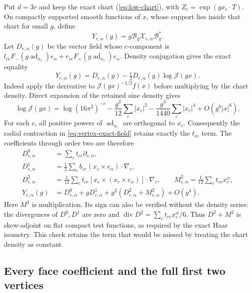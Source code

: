 Put $d=3r$ and keep the exact chart (\ref{eq:low-chart}), with
$Z_c=\exp(gx_c\cdot T)$. On compactly supported smooth functions of
$x$, whose support lies inside that chart for small $g$, define
\[
 Y_{e,\alpha}(g)=g\mathcal B_g\mathcal X_{e,\alpha}\mathcal B_g^*.
\]
Let $D_{e,\alpha}(g)$ be the vector field whose $c$-component is
$l_{ce}F_-(g\operatorname{ad}_{x_c})e_\alpha+
r_{ce}F_+(g\operatorname{ad}_{x_c})e_\alpha$.
Density conjugation gives the exact equality
\begin{equation}\label{eq:vertex-exact-field}
 Y_{e,\alpha}(g)=D_{e,\alpha}(g)
                 -\tfrac12D_{e,\alpha}(g)\log\mathcal J(gx).
\end{equation}
Indeed apply the derivative to $\mathcal J(gx)^{-1/2}f(x)$
before multiplying by the chart density. Direct expansion of the
retained sine density gives
\[
 \log\mathcal J(gx)=\log(16\pi^2)^{-r}
       -\frac{g^2}{12}\sum_c|x_c|^2
       -\frac{g^4}{1440}\sum_c|x_c|^4+O(g^6|x|^6).
\]
For each $c$, all positive powers of $\operatorname{ad}_{x_c}$
are orthogonal to $x_c$. Consequently the radial contraction in
\eqref{eq:vertex-exact-field} retains exactly the $t_{ce}$ term.
The coefficients through order two are therefore
\begin{align}
 D^0_{e,\alpha}&=\sum_c t_{ce}\partial_{c,\alpha},\nonumber\\
 D^1_{e,\alpha}&=\tfrac12\sum_c b_{ce}
                   (x_c\times e_\alpha)\cdot\nabla_c,\nonumber\\
 D^2_{e,\alpha}&=\tfrac1{12}\sum_c t_{ce}
          [x_c\times(x_c\times e_\alpha)]\cdot\nabla_c,
 \qquad M^2_{e,\alpha}=\tfrac1{12}\sum_c t_{ce}x_c^\alpha,
       \label{eq:vertex-fields}\\
 Y_{e,\alpha}(g)&=D^0_{e,\alpha}+gD^1_{e,\alpha}
                   +g^2(D^2_{e,\alpha}+M^2_{e,\alpha})+O(g^4).
       \nonumber
\end{align}
Here $M^2$ is multiplication. Its sign can also be verified without
the density series: the divergences of $D^0,D^1$ are zero and
$\operatorname{div}D^2=\sum_ct_{ce}x_c^\alpha/6$.
Thus $D^2+M^2$ is skew-adjoint on flat compact test functions,
as required by the exact Haar isometry. This check retains the
term that would be missed by treating the chart density as constant.

\subsection{Every face coefficient and the full first two vertices}

